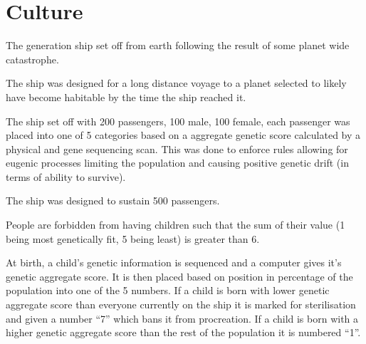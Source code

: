 \chapter{Culture}

The generation ship set off from earth following the result of some planet wide catastrophe. 

The ship was designed for a long distance voyage to a planet selected to likely have become habitable by the time the ship reached it.

The ship set off with 200 passengers, 100 male, 100 female, each passenger was placed into one of 5 categories based on a aggregate genetic score calculated by a physical and gene sequencing scan. This was done to enforce rules allowing for eugenic processes limiting the population and causing positive genetic drift (in terms of ability to survive).

The ship was designed to sustain 500 passengers.

People are forbidden from having children such that the sum of their value (1 being most genetically fit, 5 being least) is greater than 6. 

At birth, a child's genetic information is sequenced and a computer gives it's genetic aggregate score. It is then placed based on position in percentage of the population into one of the 5 numbers. If a child is born with lower genetic aggregate score than everyone currently on the ship it is marked for sterilisation and given a number ``7'' which bans it from procreation. If a child is born with a higher genetic aggregate score than the rest of the population it is numbered ``1''.